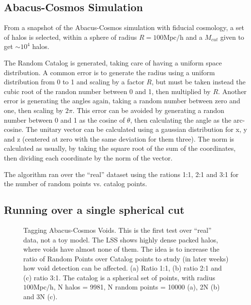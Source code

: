 \documentclass[preprint]{aastex62}
\begin{document}
\subsection{Abacus-Cosmos Simulation}

From a snapshot of the Abacus-Cosmos simulation with fiducial cosmology, a set of
halos is selected, within a sphere of radius $R=100\mathrm{Mpc/h}$ and a $M_{cut}$
given to get $\sim 10^4$ halos.

The Random Catalog is generated, taking care of having a uniform space
distribution. A common error is to generate the radius using a uniform
distribution from 0 to 1 and scaling by a factor $R$,
but must be taken instead the cubic root of the randon number between 0 and 1,
then multiplied by $R$. Another error is generating the angles again, taking a
random number between zero and one, then scaling by $2\pi$. This error can be
avoided by generating a randon number between 0 and 1 as the cosine of $\theta$,
then calculating the angle as the arc-cosine. The unitary vector can be
calculated using a gaussian distribution for x, y and z (centered at zero
with the same deviation for them three).  %
The norm is calculated as usually, by taking the square root of the sum of
the coordinates, then dividing each coordinate by the norm of the vector.

The algorithm ran over the ``real'' dataset using the rations 1:1, 2:1
and 3:1 for the number of random points vs. catalog points.

\subsection{Running over a single spherical cut}

\begin{figure}
  \caption{Tagging Abacus-Cosmos Voids. This is the first test over ``real''
    data, not a toy model. The LSS shows highly dense packed halos, where
    voids have almost none of them. The idea is to increase the ratio of
    Random Points over Catalog points to study (in later weeks) how void
    detection can be affected. (a) Ratio 1:1, (b) ratio 2:1 and (c) ratio 3:1.
    The catalog is a spherical set of points, with radius $100 \mathrm{Mpc/h}$,
    N halos = 9981, N random points = 10000 (a), 2N (b) and 3N (c).
    \label{fig:Tagging Abacus Cosmos Voids}}
\end{figure}
\end{document}
